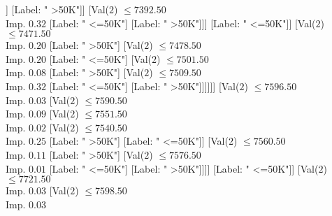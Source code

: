 \documentclass[margin=10pt]{standalone}
\begin{document}
\begin{forest}
																																								[Val($2$) $ \leq 7355.50$ \\ Imp. $0.04$
																																									[Label: " <=50K"]
																																									[Label: " >50K"]]
																																								[Label: " >50K"]]
																																							[Val($2$) $ \leq 7392.50$ \\ Imp. $0.32$
																																								[Label: " <=50K"]
																																								[Label: " >50K"]]]
																																						[Label: " <=50K"]]
																																					[Val($2$) $ \leq 7471.50$ \\ Imp. $0.20$
																																						[Label: " >50K"]
																																						[Val($2$) $ \leq 7478.50$ \\ Imp. $0.20$
																																							[Label: " <=50K"]
																																							[Val($2$) $ \leq 7501.50$ \\ Imp. $0.08$
																																								[Label: " >50K"]
																																								[Val($2$) $ \leq 7509.50$ \\ Imp. $0.32$
																																									[Label: " <=50K"]
																																									[Label: " >50K"]]]]]]
																																				[Val($2$) $ \leq 7596.50$ \\ Imp. $0.03$
																																					[Val($2$) $ \leq 7590.50$ \\ Imp. $0.09$
																																						[Val($2$) $ \leq 7551.50$ \\ Imp. $0.02$
																																							[Val($2$) $ \leq 7540.50$ \\ Imp. $0.25$
																																								[Label: " >50K"]
																																								[Label: " <=50K"]]
																																							[Val($2$) $ \leq 7560.50$ \\ Imp. $0.11$
																																								[Label: " >50K"]
																																								[Val($2$) $ \leq 7576.50$ \\ Imp. $0.01$
																																									[Label: " <=50K"]
																																									[Label: " >50K"]]]]
																																						[Label: " <=50K"]]
																																					[Val($2$) $ \leq 7721.50$ \\ Imp. $0.03$
																																						[Val($2$) $ \leq 7598.50$ \\ Imp. $0.03$

\end{forest}
\end{document}
